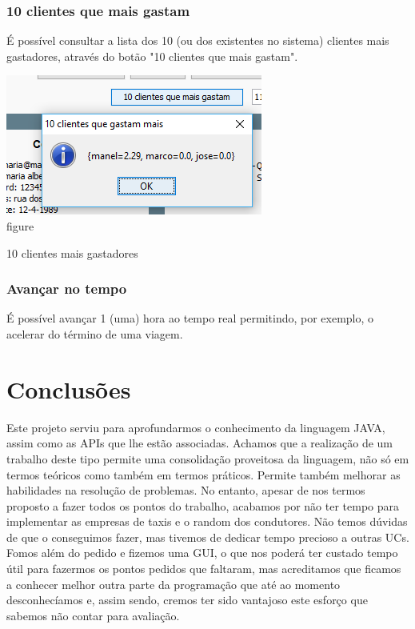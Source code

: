 \documentclass[a4paper]{article}
\begin{document}
\subsubsection{10 clientes que mais gastam}
É possível consultar a lista dos 10 (ou dos existentes no sistema) clientes mais gastadores, através do botão "10 clientes que mais gastam".
\begin{center}
  \includegraphics[scale=0.75]{outras_10mais}\\
  \caption{figure}{10 clientes mais gastadores}
  \label{fig:picture}
\end{center}
\subsubsection{Avançar no tempo}
É possível avançar 1 (uma) hora ao tempo real permitindo, por exemplo, o acelerar do término de uma viagem.


\section{Conclusões}
\label{sec:conclusao}
Este projeto serviu para aprofundarmos o conhecimento da linguagem JAVA, assim como as APIs que lhe estão associadas. Achamos que a realização de um trabalho deste tipo permite uma consolidação proveitosa da linguagem, não só em termos teóricos como também em termos práticos. Permite também melhorar as habilidades na resolução de problemas. No entanto, apesar de nos termos proposto a fazer todos os pontos do trabalho, acabamos por não ter tempo para implementar as empresas de taxis e o random dos condutores. Não temos dúvidas de que o conseguimos fazer, mas tivemos de dedicar tempo precioso a outras UCs. Fomos além do pedido e fizemos uma GUI, o que nos poderá ter custado tempo útil para fazermos os pontos pedidos que faltaram, mas acreditamos que ficamos a conhecer melhor outra parte da programação que até ao momento desconhecíamos e, assim sendo, cremos ter sido vantajoso este esforço que sabemos não contar para avaliação.
\end{document}
